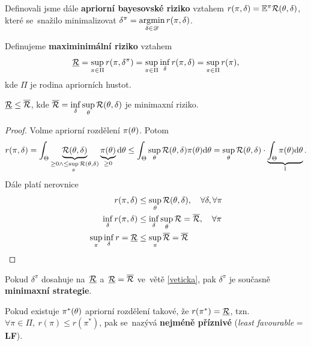 Definovali jsme dále \textbf{apriorní bayesovské riziko} vztahem $r(\pi,\delta)=\mathbb{E}^\pi\mathcal{R}(\theta,\delta)$, které se~snažilo minimalizovat $\delta^{\pi}=\mathop{\mathrm{argmin}}\limits_{\delta\in\mathscr{D} }r(\pi,\delta)$.
\begin{define}
Definujeme \textbf{maximinimální riziko} vztahem $$\underline{\mathcal{R}}=\sup\limits_{\pi\in\Pi} r(\pi,\delta^{\pi})=\sup\limits_{\pi\in\Pi}\inf\limits_{\delta} r(\pi,\delta)=\sup\limits_{\pi\in\Pi}r(\pi),$$ kde $\Pi$ je rodina apriorních hustot.
\end{define}
\begin{theorem}\label{veticka}
	$\underline{\mathcal{R}}\leq \overline{\mathcal{R}}$, kde $\overline{\mathcal{R}}=\inf\limits_\delta\sup\limits_\theta \mathcal{R}(\theta,\delta)$ je minimaxní riziko.
	\begin{proof}
		Volme apriorní rozdělení $\pi(\theta)$. Potom $$ r(\pi,\delta)=\int_\Theta\underbrace{\mathcal{R}(\theta,\delta)}_{\geq0\wedge\leq \sup\limits_{\theta}\mathcal{R}(\theta,\delta)}\underbrace{\pi(\theta)}_{\geq0}\mathrm{d}\theta\leq \int_{\Theta}\sup\limits_\theta \mathcal{R}(\theta,\delta)\pi(\theta)\mathrm{d}\theta=\sup\limits_\theta \mathcal{R}(\theta,\delta)\cdot \underbrace{\int_{\Theta}\pi(\theta)\mathrm{d}\theta}_{1}.$$
		Dále platí nerovnice \[
		\begin{split}
		r(\pi,\delta)&\leq \sup\limits_\theta\mathcal{R}(\theta,\delta),\quad \forall\delta,\forall\pi\\
		\inf\limits_\delta r(\pi,\delta)&\leq \inf\limits_\delta\sup\limits_\theta \mathcal{R} =\overline{\mathcal{R}},\quad \forall\pi\\
		\sup\limits_\pi\inf\limits_\delta r=\underline{\mathcal{R}}&\leq \sup\limits_{\pi}\overline{\mathcal{R}}=\overline{\mathcal{R}}
		\end{split}
		\]
	\end{proof}
\end{theorem}
\begin{remark}
	Pokud $\delta^\pi$ dosahuje na~$\underline{\mathcal{R}}$ a~$\underline{\mathcal{R}}=\overline{\mathcal{R}}$ ve~větě \ref{veticka}, pak $\delta^\pi$ je současně \textbf{minimaxní strategie}.
\end{remark}
\begin{define}
	Pokud existuje $\pi^\ast(\theta)$ apriorní rozdělení takové, že $r(\pi ^\ast)=\underline{\mathcal{R}}$, tzn. $\forall\pi\in\Pi,~r(\pi)\leq r(\pi^\ast)$, pak se~nazývá \textbf{nejméně příznivé} (\textit{least favourable} = \textbf{LF}).
\end{define}

